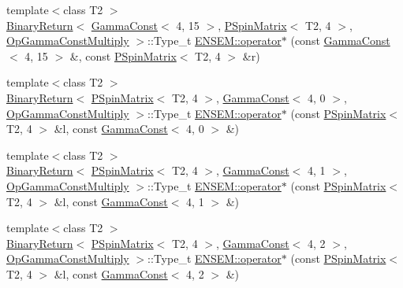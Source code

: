 \begin{DoxyCompactItemize}
\item 
{\footnotesize template$<$class T2 $>$ }\\\mbox{\hyperlink{structENSEM_1_1BinaryReturn}{Binary\+Return}}$<$ \mbox{\hyperlink{classENSEM_1_1GammaConst}{Gamma\+Const}}$<$ 4, 15 $>$, \mbox{\hyperlink{classENSEM_1_1PSpinMatrix}{P\+Spin\+Matrix}}$<$ T2, 4 $>$, \mbox{\hyperlink{structENSEM_1_1OpGammaConstMultiply}{Op\+Gamma\+Const\+Multiply}} $>$\+::Type\+\_\+t \mbox{\hyperlink{group__primspinmatrix_gaf61c9e0fced9fe43e7016043fadb4e98}{E\+N\+S\+E\+M\+::operator$\ast$}} (const \mbox{\hyperlink{classENSEM_1_1GammaConst}{Gamma\+Const}}$<$ 4, 15 $>$ \&, const \mbox{\hyperlink{classENSEM_1_1PSpinMatrix}{P\+Spin\+Matrix}}$<$ T2, 4 $>$ \&r)
\item 
{\footnotesize template$<$class T2 $>$ }\\\mbox{\hyperlink{structENSEM_1_1BinaryReturn}{Binary\+Return}}$<$ \mbox{\hyperlink{classENSEM_1_1PSpinMatrix}{P\+Spin\+Matrix}}$<$ T2, 4 $>$, \mbox{\hyperlink{classENSEM_1_1GammaConst}{Gamma\+Const}}$<$ 4, 0 $>$, \mbox{\hyperlink{structENSEM_1_1OpGammaConstMultiply}{Op\+Gamma\+Const\+Multiply}} $>$\+::Type\+\_\+t \mbox{\hyperlink{group__primspinmatrix_ga55a6793cedfea5afc1bafa2c470d0350}{E\+N\+S\+E\+M\+::operator$\ast$}} (const \mbox{\hyperlink{classENSEM_1_1PSpinMatrix}{P\+Spin\+Matrix}}$<$ T2, 4 $>$ \&l, const \mbox{\hyperlink{classENSEM_1_1GammaConst}{Gamma\+Const}}$<$ 4, 0 $>$ \&)
\item 
{\footnotesize template$<$class T2 $>$ }\\\mbox{\hyperlink{structENSEM_1_1BinaryReturn}{Binary\+Return}}$<$ \mbox{\hyperlink{classENSEM_1_1PSpinMatrix}{P\+Spin\+Matrix}}$<$ T2, 4 $>$, \mbox{\hyperlink{classENSEM_1_1GammaConst}{Gamma\+Const}}$<$ 4, 1 $>$, \mbox{\hyperlink{structENSEM_1_1OpGammaConstMultiply}{Op\+Gamma\+Const\+Multiply}} $>$\+::Type\+\_\+t \mbox{\hyperlink{group__primspinmatrix_gaf4a854dbb554a35d450e52f9edaae13e}{E\+N\+S\+E\+M\+::operator$\ast$}} (const \mbox{\hyperlink{classENSEM_1_1PSpinMatrix}{P\+Spin\+Matrix}}$<$ T2, 4 $>$ \&l, const \mbox{\hyperlink{classENSEM_1_1GammaConst}{Gamma\+Const}}$<$ 4, 1 $>$ \&)
\item 
{\footnotesize template$<$class T2 $>$ }\\\mbox{\hyperlink{structENSEM_1_1BinaryReturn}{Binary\+Return}}$<$ \mbox{\hyperlink{classENSEM_1_1PSpinMatrix}{P\+Spin\+Matrix}}$<$ T2, 4 $>$, \mbox{\hyperlink{classENSEM_1_1GammaConst}{Gamma\+Const}}$<$ 4, 2 $>$, \mbox{\hyperlink{structENSEM_1_1OpGammaConstMultiply}{Op\+Gamma\+Const\+Multiply}} $>$\+::Type\+\_\+t \mbox{\hyperlink{group__primspinmatrix_ga5a4c1e3861766e39bd44a3b7be45b5bb}{E\+N\+S\+E\+M\+::operator$\ast$}} (const \mbox{\hyperlink{classENSEM_1_1PSpinMatrix}{P\+Spin\+Matrix}}$<$ T2, 4 $>$ \&l, const \mbox{\hyperlink{classENSEM_1_1GammaConst}{Gamma\+Const}}$<$ 4, 2 $>$ \&)

\end{DoxyCompactItemize}
